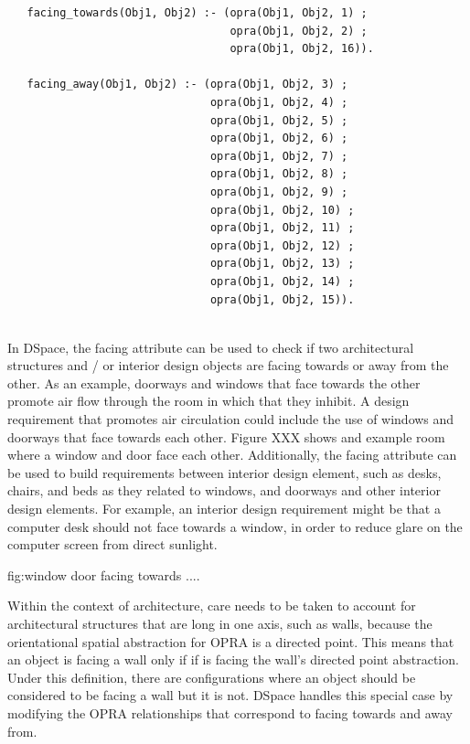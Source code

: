 \documentclass[12pt]{ucthesis}
\begin{document}
\begin{verbatim}
   facing_towards(Obj1, Obj2) :- (opra(Obj1, Obj2, 1) ;
                                  opra(Obj1, Obj2, 2) ;
                                  opra(Obj1, Obj2, 16)).
                                 
   facing_away(Obj1, Obj2) :- (opra(Obj1, Obj2, 3) ;
                               opra(Obj1, Obj2, 4) ;
                               opra(Obj1, Obj2, 5) ;
                               opra(Obj1, Obj2, 6) ;
                               opra(Obj1, Obj2, 7) ;
                               opra(Obj1, Obj2, 8) ;
                               opra(Obj1, Obj2, 9) ;
                               opra(Obj1, Obj2, 10) ;
                               opra(Obj1, Obj2, 11) ;
                               opra(Obj1, Obj2, 12) ;
                               opra(Obj1, Obj2, 13) ;
                               opra(Obj1, Obj2, 14) ;
                               opra(Obj1, Obj2, 15)).
                                  
\end{verbatim}

In DSpace, the facing attribute can be used to check if two architectural structures and / or interior design objects are facing towards or away from the other. As an example, doorways and windows that face towards the other promote air flow through the room in which that they inhibit. A design requirement that promotes air circulation could include the use of windows and doorways that face towards each other. Figure XXX shows and example room where a window and door face each other. Additionally, the facing attribute can be used to build requirements between interior design element, such as desks, chairs, and beds as they related to windows, and doorways and other interior design elements. For example, an interior design requirement might be that a computer desk should not face towards a window, in order to reduce glare on the computer screen from direct sunlight. 

fig:window door facing towards ....

Within the context of architecture, care needs to be taken to account for architectural structures that are long in one axis, such as walls, because the orientational spatial abstraction for OPRA is a directed point. This means that an object is facing a wall only if if is facing the wall's directed point abstraction. Under this definition, there are configurations where an object should be considered to be facing a wall but it is not. DSpace handles this special case by modifying the OPRA relationships that correspond to facing towards and away from. 
\end{document}
